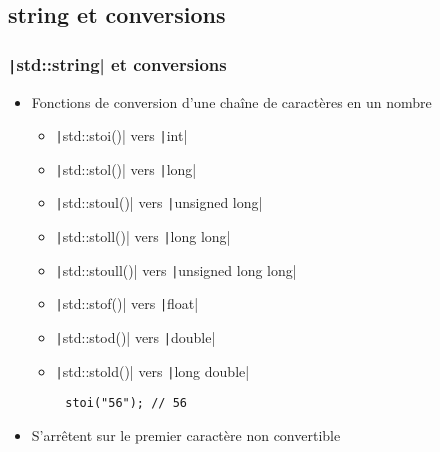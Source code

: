 \documentclass[C++.tex]{subfiles}
\begin{document}
\subsection*{string et conversions}
\begin{frame}[fragile]
	\frametitle{\texttt|std::string| et conversions}
	\begin{itemize}
		\item Fonctions de conversion d'une chaîne de caractères en un nombre
		\begin{itemize}
			\item \texttt|std::stoi()| vers \texttt|int|
			\item \texttt|std::stol()| vers \texttt|long|
			\item \texttt|std::stoul()| vers \texttt|unsigned long|
			\item \texttt|std::stoll()| vers \texttt|long long|
			\item \texttt|std::stoull()| vers \texttt|unsigned long long|
			\item \texttt|std::stof()| vers \texttt|float|
			\item \texttt|std::stod()| vers \texttt|double|
			\item \texttt|std::stold()| vers \texttt|long double|
		\end{itemize}
	\end{itemize}

	\begin{verbatim}
		stoi("56"); // 56
	\end{verbatim}

	\begin{itemize}
		\item S'arrêtent sur le premier caractère non convertible
	\end{itemize}
\end{frame}
\end{document}
